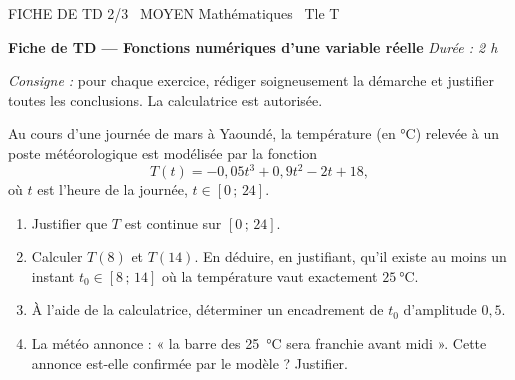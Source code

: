 \documentclass[11pt]{article}
\begin{document}
\begin{tcolorbox}[enhanced,colback=popink,colframe=popink,arc=10pt,boxrule=0pt,left=12pt,right=12pt,top=9pt,bottom=9pt]
{\color{white}\popxbold\small FICHE DE TD 2/3 \textbullet\ MOYEN \hfill Mathématiques \textbullet\ Tle T\par}
\end{tcolorbox}
\vspace{4pt}
\textbf{Fiche de TD — Fonctions numériques d'une variable réelle} \hfill \textit{Durée : 2 h}

\textit{Consigne :} pour chaque exercice, rédiger soigneusement la démarche et justifier toutes les conclusions. La calculatrice est autorisée.

\begin{exercice}
Au cours d'une journée de mars à Yaoundé, la température (en \si{\celsius}) relevée à un poste météorologique est modélisée par la fonction
\[ T(t)=-0{,}05t^3+0{,}9t^2-2t+18, \]
où $t$ est l'heure de la journée, $t\in[0\,;\,24]$.
\begin{enumerate}
\item Justifier que $T$ est continue sur $[0\,;\,24]$.
\item Calculer $T(8)$ et $T(14)$. En déduire, en justifiant, qu'il existe au moins un instant $t_0\in[8\,;\,14]$ où la température vaut exactement $\SI{25}{\celsius}$.
\item À l'aide de la calculatrice, déterminer un encadrement de $t_0$ d'amplitude $0{,}5$.
\item La météo annonce : « la barre des \SI{25}{\celsius} sera franchie avant midi ». Cette annonce est-elle confirmée par le modèle ? Justifier.
\end{enumerate}
\end{exercice}
\end{document}
